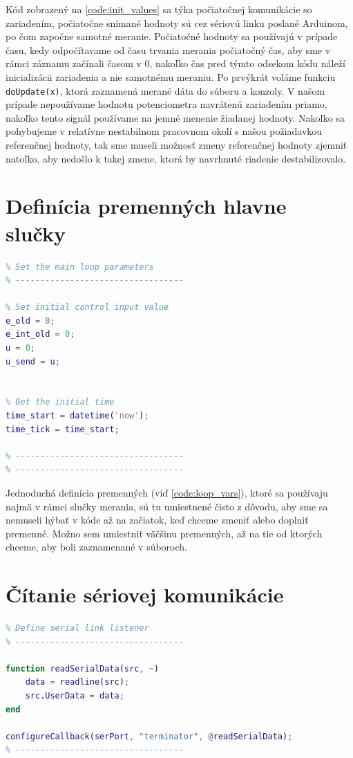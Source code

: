 \documentclass[a4paper, 10pt, ]{article}
\begin{document}
Kód zobrazený na \ref{code:init_values} sa týka počiatočnej komunikácie so zariadením, počiatočne snímané hodnoty sú cez sériovú linku poslané Arduinom, po čom započne samotné meranie. Počiatočné hodnoty sa používajú v prípade času, kedy odpočítavame od času trvania merania počiatočný čas, aby sme v rámci záznamu začínali časom v $0$, nakoľko čas pred týmto odsekom kódu náleží inicializácii zariadenia a nie samotnému meraniu.
Po prvýkrát voláme funkciu \texttt{doUpdate(x)}, ktorá zaznamená merané dáta do súboru a konzoly. V našom prípade nepoužívame hodnotu potenciometra navrátenú zariadením priamo, nakoľko tento signál používame na jemné menenie žiadanej hodnoty. Nakoľko sa pohybujeme v relatívne nestabilnom pracovnom okolí s našou požiadavkou referenčnej hodnoty, tak sme museli možnosť zmeny referenčnej hodnoty zjemniť natoľko, aby nedošlo k takej zmene, ktorá by navrhnuté riadenie destabilizovalo.

\section{Definícia premenných hlavne slučky}
\begin{lstlisting}[caption=Nastavenie premenných v hlavnej slučke., label={code:loop_vars}, language=Matlab]
% ----------------------------------
% Set the main loop parameters
% ----------------------------------

% Set initial control input value
e_old = 0;
e_int_old = 0;
u = 0;
u_send = u;


% Get the initial time
time_start = datetime('now');
time_tick = time_start;

% ----------------------------------
% ----------------------------------
\end{lstlisting}

Jednoduchá definícia premenných (viď \ref{code:loop_vars}), ktoré sa používaju najmä v rámci slučky merania, sú tu umiestnené čisto z dôvodu, aby sme sa nemuseli hýbať v kóde až na začiatok, keď chceme zmeniť alebo doplniť premenné. Možno sem umiestniť väčšinu premenných, až na tie od ktorých chceme, aby boli zaznamenané v súboroch.

\section{Čítanie sériovej komunikácie}
\begin{lstlisting}[caption=Definícia počúvateľa sériovej komunikácie., label={code:read}, language=Matlab]
% ----------------------------------
% Define serial link listener
% ----------------------------------

function readSerialData(src, ~) 
    data = readline(src);
    src.UserData = data;
end

configureCallback(serPort, "terminator", @readSerialData);
% ----------------------------------
\end{lstlisting}
\end{document}
